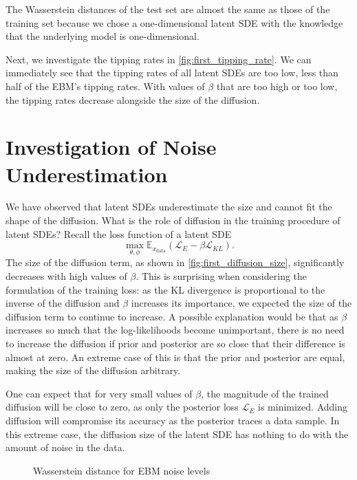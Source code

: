 \documentclass[twoside,11pt]{article}
\begin{document}
The Wasserstein distances of the test set are almost the same as those of the training set because we chose a one-dimensional latent SDE with the knowledge that the underlying model is one-dimensional.

Next, we investigate the tipping rates in \cref{fig:first_tipping_rate}. We can immediately see that the tipping rates of all latent SDEs are too low, less than half of the EBM's tipping rates. With values of \(\beta\) that are too high or too low, the tipping rates decrease alongside the size of the diffusion.


\section{Investigation of Noise Underestimation}

We have observed that latent SDEs underestimate the size and cannot fit the shape of the diffusion. What is the role of diffusion in the training procedure of latent SDEs? Recall the loss function of a latent SDE
\[
  \max_{\theta, \phi} \mathbb{E}_{x_{\text{data}}} (\mathcal{L}_E - \beta \mathcal{L}_{KL}).
\]
The size of the diffusion term, as shown in \cref{fig:first_diffusion_size}, significantly decreases with high values of \(\beta\). This is surprising when considering the formulation of the training loss: as the KL divergence is proportional to the inverse of the diffusion and \(\beta\) increases its importance, we expected the size of the diffusion term to continue to increase. A possible explanation would be that as \(\beta\) increases so much that the log-likelihoods become unimportant, there is no need to increase the diffusion if prior and posterior are so close that their difference is almost at zero. An extreme case of this is that the prior and posterior are equal, making the size of the diffusion arbitrary.

One can expect that for very small values of \(\beta\), the magnitude of the trained diffusion will be close to zero, as only the posterior loss \(\mathcal{L}_E\) is minimized. Adding diffusion will compromise its accuracy as the posterior traces a data sample. In this extreme case, the diffusion size of the latent SDE has nothing to do with the amount of noise in the data.

\begin{figure}
    \begin{center}
    
    \end{center}
    \caption{Wasserstein distance for EBM noise levels}
    \label{fig:noise_wasserstein}
\end{figure}
\end{document}
